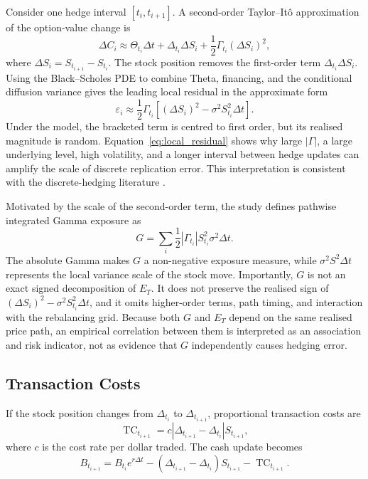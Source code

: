\documentclass[11pt,a4paper]{article}
\begin{document}
Consider one hedge interval $[t_i,t_{i+1}]$. A second-order Taylor--It\^o approximation of the option-value change is
\begin{equation}
\Delta C_i
\approx
\Theta_{t_i}\Delta t
+\Delta_{t_i}\Delta S_i
+\frac{1}{2}\Gamma_{t_i}(\Delta S_i)^2,
\label{eq:taylor}
\end{equation}
where $\Delta S_i=S_{t_{i+1}}-S_{t_i}$. The stock position removes the first-order term $\Delta_{t_i}\Delta S_i$. Using the Black--Scholes PDE to combine Theta, financing, and the conditional diffusion variance gives the leading local residual in the approximate form
\begin{equation}
\varepsilon_i
\approx
\frac{1}{2}\Gamma_{t_i}
\left[(\Delta S_i)^2-\sigma^2S_{t_i}^2\Delta t\right].
\label{eq:local_residual}
\end{equation}
Under the model, the bracketed term is centred to first order, but its realised magnitude is random. Equation~\eqref{eq:local_residual} shows why large $|\Gamma|$, a large underlying level, high volatility, and a longer interval between hedge updates can amplify the scale of discrete replication error. This interpretation is consistent with the discrete-hedging literature \citep{boyleemanuel1980,bertsimaskoganlo2000,gobettemam2001}.

Motivated by the scale of the second-order term, the study defines pathwise integrated Gamma exposure as
\begin{equation}
    G=\sum_i\frac{1}{2}|\Gamma_{t_i}|S_{t_i}^2\sigma^2\Delta t.
\label{eq:gamma_exposure}
\end{equation}
The absolute Gamma makes $G$ a non-negative exposure measure, while $\sigma^2S^2\Delta t$ represents the local variance scale of the stock move. Importantly, $G$ is not an exact signed decomposition of $E_T$. It does not preserve the realised sign of $(\Delta S_i)^2-\sigma^2S_{t_i}^2\Delta t$, and it omits higher-order terms, path timing, and interaction with the rebalancing grid. Because both $G$ and $E_T$ depend on the same realised price path, an empirical correlation between them is interpreted as an association and risk indicator, not as evidence that $G$ independently causes hedging error.

\subsection{Transaction Costs}

If the stock position changes from $\Delta_{t_i}$ to $\Delta_{t_{i+1}}$, proportional transaction costs are
\begin{equation}
    \operatorname{TC}_{t_{i+1}}
    =c\left|\Delta_{t_{i+1}}-\Delta_{t_i}\right|S_{t_{i+1}},
\end{equation}
where $c$ is the cost rate per dollar traded. The cash update becomes
\begin{equation}
    B_{t_{i+1}}=B_{t_i}e^{r\Delta t}
    -(\Delta_{t_{i+1}}-\Delta_{t_i})S_{t_{i+1}}
    -\operatorname{TC}_{t_{i+1}}.
\end{equation}
\end{document}
